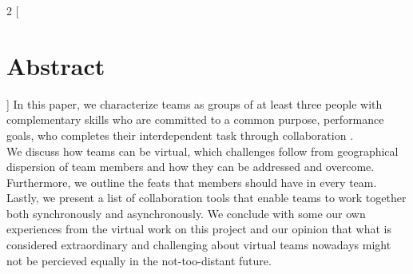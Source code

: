 \begin{multicols}{2}
[\section{Abstract}]
In this paper, we characterize teams as groups of at least three people with complementary skills who are committed to a 
common purpose, performance goals, who completes their interdependent task through collaboration \cite{katzenbach2003the}.\\
 We discuss how 
teams can be virtual, which challenges follow from geographical dispersion of team members and how they can be addressed and 
overcome. Furthermore, we outline the feats that members should have in every team.\\
 Lastly, we present a list of collaboration 
tools that enable teams to work together both synchronously and asynchronously. We conclude with some our own experiences 
from the virtual work on this project and our opinion that what is considered extraordinary and challenging about virtual 
teams nowadays might not be percieved equally in the not-too-distant future.
\end{multicols}